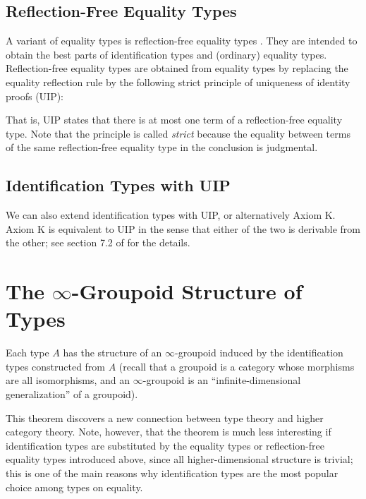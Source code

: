 \documentclass[11pt]{article}
\begin{document}
\subsection{Reflection-Free Equality Types}
A variant of equality types is reflection-free equality types \cite{sterling_et_al:LIPIcs:2019:10538}. They are intended to obtain the best parts of identification types and (ordinary) equality types. Reflection-free equality types are obtained from equality types by replacing the equality reflection rule by the following strict principle of uniqueness of identity proofs (UIP):

\begin{prooftree*}
\end{prooftree*}

That is, UIP states that there is at most one term of a reflection-free equality type.
Note that the principle is called \emph{strict} because the equality between terms of the same reflection-free equality type in the conclusion is judgmental. 

\subsection{Identification Types with UIP}

We can also extend identification types with UIP, or alternatively Axiom K. Axiom K is equivalent to UIP in the sense that either of the two is derivable from the other; see section 7.2 of \cite{hott-as:book} for the details. 

\section{The $\infty$-Groupoid Structure of Types}

\begin{theorem}
Each type $A$ has the structure of an $\infty$-groupoid induced by the identification types constructed from $A$ (recall that a groupoid is a category whose morphisms are all isomorphisms, and an $\infty$-groupoid is an ``infinite-dimensional generalization'' of a groupoid).
\end{theorem}

This theorem discovers a new connection between type theory and higher category theory. Note, however, that the theorem is much less interesting if identification types are substituted by the equality types or reflection-free equality types introduced above, since all higher-dimensional structure is trivial; this is one of the main reasons why identification types are the most popular choice among types on equality.
\end{document}
